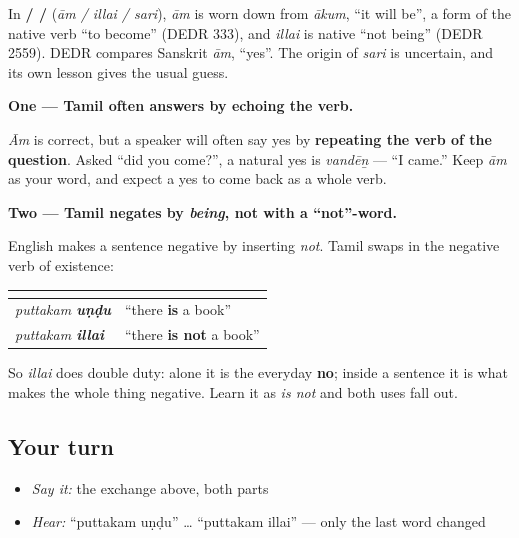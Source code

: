 \begin{cousinweb}
In \textbf{ /  / } (\emph{ām / illai / sari}), \emph{ām} is worn down from \emph{ākum}, \textquotedblleft{}it will be\textquotedblright{}, a form of the native verb \textquotedblleft{}to become\textquotedblright{} (DEDR 333), and \emph{illai} is native \textquotedblleft{}not being\textquotedblright{} (DEDR 2559). DEDR compares Sanskrit \emph{ām}, \textquotedblleft{}yes\textquotedblright{}. The origin of \emph{sari} is uncertain, and its own lesson gives the usual guess.
\end{cousinweb}

\begin{grammarlens}[title={Grammar Lens: two habits behind the answers}]
\textbf{One — Tamil often answers by echoing the verb.}

\emph{Ām} is correct, but a speaker will often say yes by \textbf{repeating the verb of the question}. Asked \textquotedblleft{}did you come?\textquotedblright{}, a natural yes is \emph{vandēṉ} — \textquotedblleft{}I came.\textquotedblright{} Keep \emph{ām} as your word, and expect a yes to come back as a whole verb.

\textbf{Two — Tamil negates by \emph{being}, not with a \textquotedblleft{}not\textquotedblright{}-word.}

English makes a sentence negative by inserting \emph{not}. Tamil swaps in the negative verb of existence:

\noindent
\begin{tabularx}{\linewidth}{@{}>{\raggedright\arraybackslash}X>{\raggedright\arraybackslash}X@{}}
\toprule
\textbf{} & \textbf{} \\
\midrule
\emph{puttakam \textbf{uṇḍu}} & \textquotedblleft{}there \textbf{is} a book\textquotedblright{} \\
\emph{puttakam \textbf{illai}} & \textquotedblleft{}there \textbf{is not} a book\textquotedblright{} \\
\bottomrule
\end{tabularx}

So \emph{illai} does double duty: alone it is the everyday \textbf{no}; inside a sentence it is what makes the whole thing negative. Learn it as \emph{is not} and both uses fall out.
\end{grammarlens}

\subsection*{Your turn}
\begin{itemize}
\raggedright
  \item \emph{Say it:} the exchange above, both parts
  \item \emph{Hear:} \textquotedblleft{}puttakam uṇḍu\textquotedblright{} … \textquotedblleft{}puttakam illai\textquotedblright{} — only the last word changed
\end{itemize}

